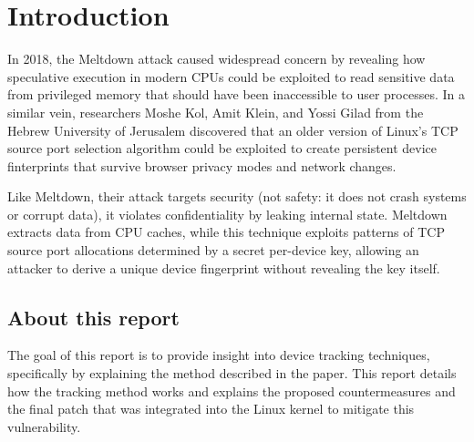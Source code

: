 \documentclass{report}
\begin{document}
\fontsize{8pt}{9pt}\selectfont
{}



\tableofcontents
\thispagestyle{empty}
\clearpage
\pagestyle{plain}

\listoffigures

\clearpage
{}
\pagestyle{default}

\chapter{Introduction}
\label{sec:introduction}

In 2018, the \alert{Meltdown} attack caused widespread concern by revealing how speculative execution in modern CPUs could be exploited to read sensitive data from privileged memory that should have been inaccessible to user processes. In a similar vein, researchers Moshe Kol, Amit Klein, and Yossi Gilad from the Hebrew University of Jerusalem discovered that an older version of Linux’s TCP source port selection algorithm could be exploited to create persistent device finterprints that survive browser privacy modes and network changes. %

Like Meltdown, their attack targets \alert{security} (not safety: it does not crash systems or corrupt data), it violates confidentiality by leaking internal state. Meltdown extracts data from CPU caches, while this technique exploits patterns of TCP source port allocations determined by a secret per-device key, allowing an attacker to derive a unique \alert{device fingerprint} without revealing the key itself.

\section{About this report}
\label{sec:goal_of_this_report}

The goal of this report is to provide insight into device tracking techniques, specifically by explaining the method described in the paper\cite{kol2022devicetrackinglinuxsnew}. This report details how the tracking method works and explains the proposed countermeasures and the final patch that was integrated into the Linux kernel to mitigate this vulnerability.
\end{document}
